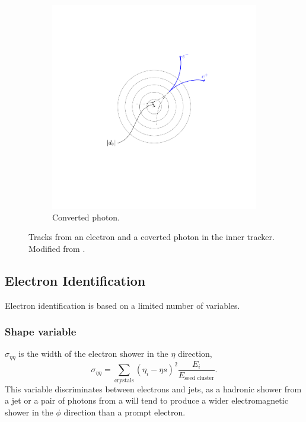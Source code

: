 \begin{figure}[htbp]
\begin{subfigure}{0.49\textwidth}
    \includegraphics[trim = 35mm 40mm 30mm 30mm, clip,width=\textwidth]{doca}
    \caption{Converted photon.}
    \label{fig:photon_path}
  \end{subfigure}
  \caption{Tracks from an electron and a coverted photon in the inner tracker. Modified from \cite{eConver}.}
  \label{fig:conversion}
\end{figure}


\subsection{Electron Identification}
Electron identification is based on a limited number of variables.

\subsubsection{Shape variable}

$\sigma_{\eta\eta}$ is the width of the electron shower in the $\eta$
direction,
\begin{equation}
\sigma_{\eta\eta} = 
\sum_{\text{crystals}} \left(\eta_{i} - \eta{s}\right)^{2}
\frac{E_{i}}{E_{\text{seed cluster}}}.
\end{equation}
This variable discriminates between electrons and jets, as a hadronic
shower from a jet or a pair of photons from a \Ppizero will tend to produce a
wider electromagnetic shower in the $\phi$ direction than a prompt electron.

